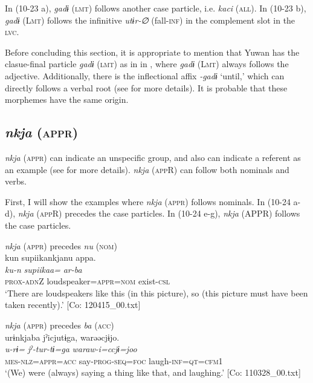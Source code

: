 In (10-23 a), \textit{gadɨ} (\textsc{lmt}) follows another case particle, i.e. \textit{kaci} (\textsc{all}). In (10-23 b), \textit{gadɨ} (L\textsc{mt}) follows the infinitive \textit{utɨr-∅} (fall-\textsc{inf}) in the complement slot in the \textsc{lvc}.

  Before concluding this section, it is appropriate to mention that Yuwan has the clasue-final particle \textit{gadɨ} (\textsc{lmt}) as in  in , where \textit{gadɨ} (L\textsc{mt}) always follows the adjective. Additionally, there is the inflectional affix \textit{{}-gadɨ} ‘until,’ which can directly follows a verbal root (see  for more details). It is probable that these morphemes have the same origin.

\subsection{\textit{nkja} (\textsc{appr})}\label{sec:10.1.6}

\textit{nkja} (\textsc{appr}) can indicate an unspecific group, and also can indicate a referent as an example (see  for more details). \textit{nkja} (\textsc{app}R) can follow both nominals and verbs.

  First, I will show the examples where \textit{nkja} (\textsc{appr}) follows nominals. In (10-24 a-d), \textit{nkja} (\textsc{app}R) precedes the case particles. In (10-24 e-g), \textit{nkja} (APPR) follows the case particles.

\ea\label{ex:10.24} 
  \ea \textit{nkja} (\textsc{appr}) precedes \textit{nu} (\textsc{nom})\\
      \glll    kun  {\textbar}supiika{\textbar}nkjanu  appa.\\
      \textit{ku-n}  \textit{supiikaa=}  \textit{ar-ba}\\
      \textsc{prox}-\textsc{adn}Z  loudspeaker=\textsc{appr}=\textsc{nom}  exist-\textsc{csl}\\
      \glt       ‘There are loudspeakers like this (in this picture), so (this picture must have been taken recently).’ [Co: 120415\_00.txt]

  \ex  \textit{nkja} (\textsc{appr}) precedes \textit{ba} (\textsc{acc})\\
      \glll    urɨnkjaba  jˀicjutɨga,  warəəcjɨjo.\\
      \textit{u-rɨ=}  \textit{jˀ-tur-tɨ=ga}  \textit{waraw-i=ccjɨ=joo}\\
      \textsc{mes}-\textsc{nlz}=\textsc{appr}=\textsc{acc}  say-\textsc{prog}-\textsc{seq}=\textsc{foc}  laugh-\textsc{inf}=\textsc{qt}=\textsc{cfm}1\\
      \glt       ‘(We) were (always) saying a thing like that, and laughing.’ [Co: 110328\_00.txt]

